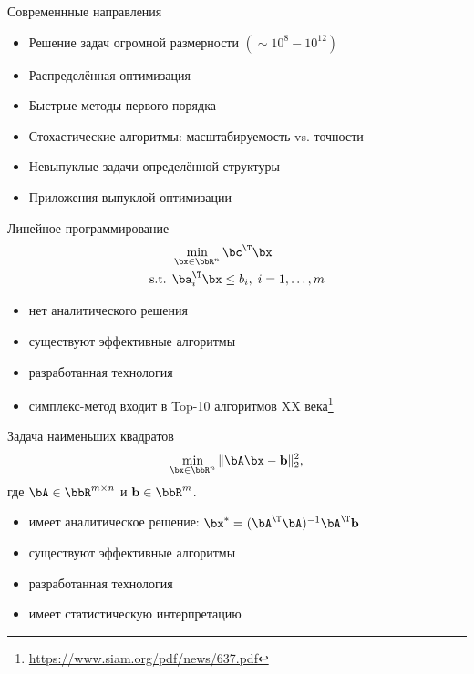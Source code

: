 \documentclass[12pt]{beamer}
\begin{document}
\begin{frame}{Современнные направления}
\begin{itemize}[<+->]
\item Решение задач огромной размерности $(\sim 10^8-10^{12})$
\item Распределённая оптимизация
\item Быстрые методы первого порядка
\item Стохастические алгоритмы: масштабируемость vs. точности
\item Невыпуклые задачи определённой структуры
\item Приложения выпуклой оптимизации
\end{itemize}
\end{frame}

\begin{frame}{Линейное программирование}
\begin{equation*}
\begin{split}
&\min\limits_{\bx \in \bbR^n} \bc^{\T}\bx\\
\text{s.t. } & \ba^{\T}_i \bx \leq b_i, \; i = 1,\ldots, m
\end{split}
\label{eq::lin_prog}
\end{equation*}
\begin{itemize}
\item нет аналитического решения
\item существуют эффективные алгоритмы
\item разработанная технология
\item симплекс-метод входит в Top-10 алгоритмов XX века\footnote{\url{https://www.siam.org/pdf/news/637.pdf}}
\end{itemize}
\end{frame}

\begin{frame}{Задача наименьших квадратов}
\begin{equation*}
\min\limits_{\bx \in \bbR^n} \|\bA\bx - \mathbf{b} \|^2_2,
\label{eq::least_sq}
\end{equation*}
где $\bA \in \bbR^{m \times n}$ и $\mathbf{b} \in \bbR^m$.
\begin{itemize}
\item имеет аналитическое решение: $\bx^* = (\bA^{\T}\bA)^{-1}\bA^{\T}\mathbf{b}$
\item существуют эффективные алгоритмы
\item разработанная технология
\item имеет статистическую интерпретацию
\end{itemize}
\end{frame}
\end{document}

